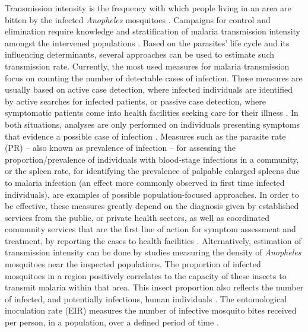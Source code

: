 Transmission intensity is the frequency with which people living in an area are bitten by the infected \textit{Anopheles} mosquitoes \cite{world2016terminology}.
Campaigns for control and elimination require knowledge and stratification of malaria transmission intensity amongst the intervened populations \cite{who2017framework, who2015guidelines}.
Based on the parasites' life cycle and its influencing determinants, several approaches can be used to estimate such transmission rate.
Currently, the most used measures for malaria transmission focus on counting the number of detectable cases of infection.
These measures are usually based on active case detection, where infected individuals are identified by active searches for infected patients, or passive case detection, where symptomatic patients come into health facilities seeking care for their illness \cite{who2017framework,doolan2002malaria}.
In both situations, analyses are only performed on individuals presenting symptoms that evidence a possible case of infection \cite{who2017framework}.
Measures such as the parasite rate (PR) -- also known as prevalence of infection -- for assessing the proportion/prevalence of individuals with blood-stage infections in a community, or the spleen rate, for identifying the prevalence of palpable enlarged spleens due to malaria infection (an effect more commonly observed in first time infected individuals), are examples of possible population-focused approaches.
In order to be effective, these measures greatly depend on the diagnosis %
given by established services from the public, or private health sectors, as well as coordinated community services that are the first line of action for symptom assessment and treatment, by reporting the cases to health facilities \cite{who2017framework}.
Alternatively, estimation of transmission intensity can be done by studies measuring the density of \textit{Anopheles} mosquitoes near the inspected populations.
The proportion of infected mosquitoes in a region positively correlates to the capacity of these insects to transmit malaria within that area.
This insect proportion also reflects the number of infected, and potentially infectious, human individuals \cite{who2015guidelines}.
The entomological inoculation rate (EIR) measures the number of infective mosquito bites received per person, in a population, over a defined period of time \cite{who2017framework}.

